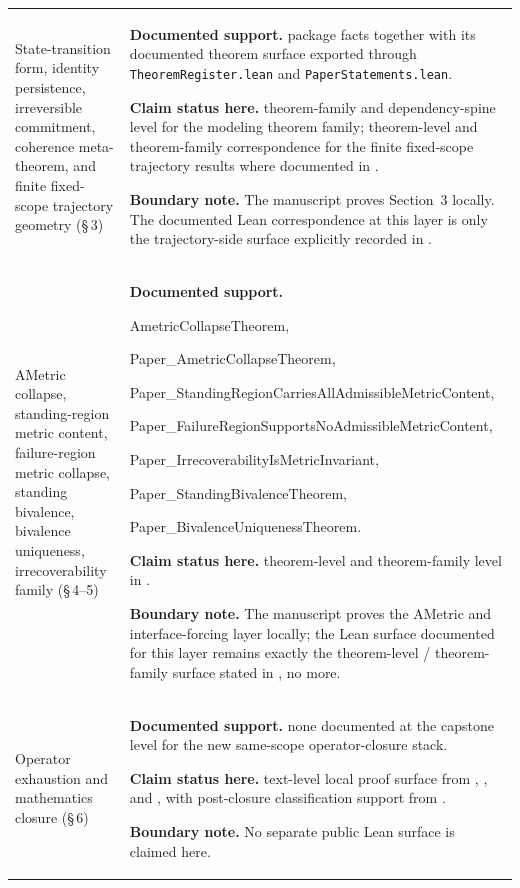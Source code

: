 {\begin{longtable}{P{0.24\textwidth}P{0.70\textwidth}}
State-transition form, identity persistence, irreversible commitment, coherence meta-theorem, and finite fixed-scope trajectory geometry (\S\,3) &
\textbf{Documented support.} \trajpaper{} package facts together with its documented theorem surface exported through \texttt{TheoremRegister.lean} and \texttt{PaperStatements.lean}.\par
\textbf{Claim status here.} theorem-family and dependency-spine level for the modeling theorem family; theorem-level and theorem-family correspondence for the finite fixed-scope trajectory results where documented in \trajpaper{}.\par
\textbf{Boundary note.} The manuscript proves Section~3 locally. The documented Lean correspondence at this layer is only the trajectory-side surface explicitly recorded in \trajpaper{}. \\

AMetric collapse, standing-region metric content, failure-region metric collapse, standing bivalence, bivalence uniqueness, irrecoverability family (\S\,4--5) &
\textbf{Documented support.} {\ttfamily\footnotesize
AmetricCollapseTheorem,\par
Paper\_AmetricCollapseTheorem,\par
Paper\_StandingRegionCarriesAllAdmissibleMetricContent,\par
Paper\_FailureRegionSupportsNoAdmissibleMetricContent,\par
Paper\_IrrecoverabilityIsMetricInvariant,\par
Paper\_StandingBivalenceTheorem,\par
Paper\_BivalenceUniquenessTheorem.}\par
\textbf{Claim status here.} theorem-level and theorem-family level in \trajpaper{}.\par
\textbf{Boundary note.} The manuscript proves the AMetric and interface-forcing layer locally; the Lean surface documented for this layer remains exactly the theorem-level / theorem-family surface stated in \trajpaper{}, no more. \\

Operator exhaustion and mathematics closure (\S\,6) &
\textbf{Documented support.} none documented at the capstone level for the new same-scope operator-closure stack.\par
\textbf{Claim status here.} text-level local proof surface from \sameoperatorsdoc{}, \clausuradoc{}, and \fixedbasedoc{}, with post-closure classification support from \eademdoc{}.\par
\textbf{Boundary note.} No separate public Lean surface is claimed here. \\


\end{longtable}}
